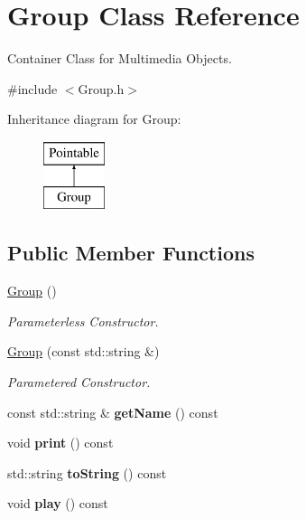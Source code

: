 \hypertarget{classGroup}{\section{Group Class Reference}
\label{classGroup}
}


Container Class for Multimedia Objects.  




{\ttfamily \#include $<$Group.\+h$>$}

Inheritance diagram for Group\+:\begin{figure}[H]
\begin{center}
\leavevmode
\includegraphics[height=2.000000cm]{classGroup}
\end{center}
\end{figure}
\subsection*{Public Member Functions}
\begin{DoxyCompactItemize}
\item 
\hypertarget{classGroup_a7b74f9ac68e0504ccf2e2854b7355ff1}{\hyperlink{classGroup_a7b74f9ac68e0504ccf2e2854b7355ff1}{Group} ()}\label{classGroup_a7b74f9ac68e0504ccf2e2854b7355ff1}

\begin{DoxyCompactList}\small\item\em Parameterless Constructor. \end{DoxyCompactList}\item 
\hypertarget{classGroup_a03b66550c572b981322a646a129392ae}{\hyperlink{classGroup_a03b66550c572b981322a646a129392ae}{Group} (const std\+::string \&)}\label{classGroup_a03b66550c572b981322a646a129392ae}

\begin{DoxyCompactList}\small\item\em Parametered Constructor. \end{DoxyCompactList}\item 
\hypertarget{classGroup_a41e1c4f5094ed0d15e5b387a4a5349d0}{const std\+::string \& {\bfseries get\+Name} () const }\label{classGroup_a41e1c4f5094ed0d15e5b387a4a5349d0}

\item 
\hypertarget{classGroup_a70432bd4aca1a8ee19c3b104d54c0c64}{void {\bfseries print} () const }\label{classGroup_a70432bd4aca1a8ee19c3b104d54c0c64}

\item 
\hypertarget{classGroup_aad096e2bceeedd1e1ea22dac8ee614da}{std\+::string {\bfseries to\+String} () const }\label{classGroup_aad096e2bceeedd1e1ea22dac8ee614da}

\item 
\hypertarget{classGroup_aa08edc49e142c99a69f4408cf6d09785}{void {\bfseries play} () const }\label{classGroup_aa08edc49e142c99a69f4408cf6d09785}

\end{DoxyCompactItemize}


